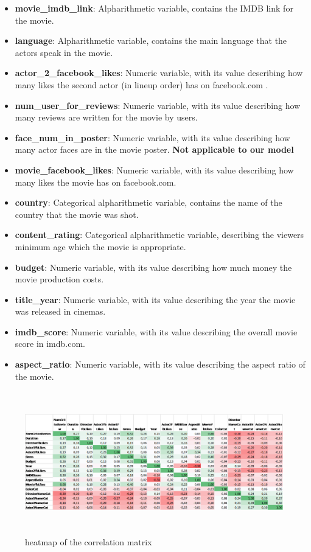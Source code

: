 \documentclass[letterpaper,twocolumn,10pt]{article}
\begin{document}
\begin{itemize}
\item \textbf{movie\_imdb\_link}: Alpharithmetic variable, contains the IMDB link for the movie. 
\item \textbf{language}: Alpharithmetic variable, contains the main language that the actors speak in the movie.
\item \textbf{actor\_2\_facebook\_likes}: Numeric variable, with its value describing how many likes the second actor (in lineup order) has on facebook.com . 
\item \textbf{num\_user\_for\_reviews}: Numeric variable, with its value describing how many reviews are written for the movie by users.
\item \textbf{face\_num\_in\_poster}: Numeric variable, with its value describing how many actor faces are in the movie poster. \textbf{Not applicable to our model}
\item \textbf{movie\_facebook\_likes}: Numeric variable, with its value describing how many likes the movie has on facebook.com.
\item \textbf{country}: Categorical alpharithmetic variable, contains the name of the country that the movie was shot.
\item \textbf{content\_rating}:  Categorical alpharithmetic variable, describing the viewers minimum age which the movie is appropriate.
\item \textbf{budget}: Numeric variable, with its value describing how much money the movie production costs.
\item \textbf{title\_year}: Numeric variable, with its value describing the year the movie was released in cinemas.
\item \textbf{imdb\_score}: Numeric variable, with its value describing the overall movie score in imdb.com.
\item \textbf{aspect\_ratio}: Numeric variable, with its value describing the aspect ratio of the movie.
\end{itemize}

\begin{figure}	
	\includegraphics[width = \textwidth,height=6.2cm]{correlation_matrix_image}
	\caption{heatmap of the correlation matrix}
\end{figure}
\end{document}
